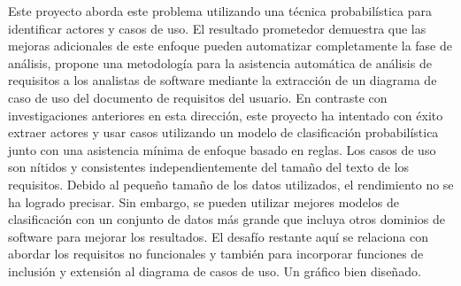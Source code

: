 Este proyecto aborda este problema utilizando una técnica probabilística para identificar actores y casos de uso. El resultado prometedor demuestra que las mejoras adicionales de este enfoque pueden automatizar completamente la fase de análisis, propone una metodología para la asistencia automática de análisis de requisitos a los analistas de software mediante la extracción de un diagrama de caso de uso del documento de requisitos del usuario.
En contraste con investigaciones anteriores en esta dirección, este proyecto ha intentado con éxito extraer actores y usar casos utilizando un modelo de clasificación probabilística junto con una asistencia mínima de enfoque basado en reglas. Los casos de uso son nítidos y consistentes independientemente del tamaño del texto de los requisitos. Debido al pequeño tamaño de los datos utilizados, el rendimiento no se ha logrado precisar. Sin embargo, se pueden utilizar mejores modelos de clasificación con un conjunto de datos más grande que incluya otros dominios de software para mejorar los resultados. El desafío restante aquí se relaciona con abordar los requisitos no funcionales y también para incorporar funciones de inclusión y extensión al diagrama de casos de uso. Un gráfico bien diseñado.


%
%



